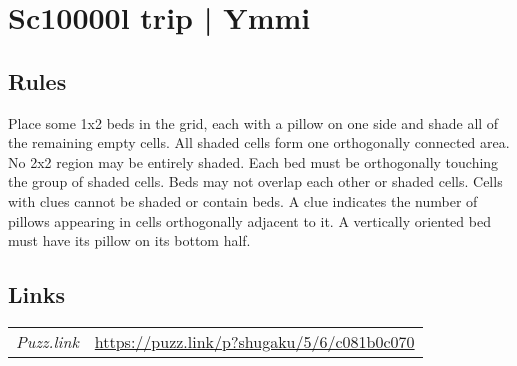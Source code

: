 \section[Sc10000l trip | Ymmi {[\emph{School Trip}]}]{Sc10000l trip | {\normalfont Ymmi}}
\label{sec:08-sc10000l-trip-ymmi}

\subsection*{Rules}
\begin{markdown}
Place some 1x2 beds in the grid, each with a pillow on one side and shade all of the remaining empty cells. All shaded cells form one orthogonally connected area. No 2x2 region may be entirely shaded. Each bed must be orthogonally touching the group of shaded cells. Beds may not overlap each other or shaded cells. Cells with clues cannot be shaded or contain beds. A clue indicates the number of pillows appearing in cells orthogonally adjacent to it. A vertically oriented bed must have its pillow on its bottom half.


\end{markdown}
\subsection*{Links}
\begin{tabularx}{\textwidth}{l X}
\emph{Puzz.link} & \url{https://puzz.link/p?shugaku/5/6/c081b0c070} \\
\end{tabularx}
\pagebreak
